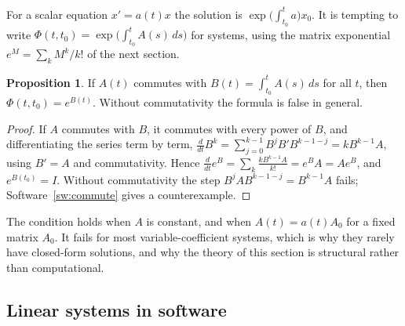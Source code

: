 \documentclass[11pt,a4paper]{article}
\numberwithin{equation}{section}
\theoremstyle{definition}
\newtheorem{prop}[thm]{Proposition}
\begin{document}
For a scalar equation $x' = a(t)x$ the solution is $\exp\bigl(\int_{t_0}^ta\bigr)x_0$. It is tempting to write $\Phi(t, t_0) = \exp\bigl(\int_{t_0}^tA(s)\,ds\bigr)$ for systems, using the matrix exponential
$e^M = \sum_kM^k/k!$ of the next section.

\begin{prop}
\label{prop:commute}
If $A(t)$ commutes with $B(t) = \int_{t_0}^tA(s)\,ds$ for all $t$, then $\Phi(t, t_0) = e^{B(t)}$. Without commutativity the formula is false in general.
\end{prop}

\begin{proof}
If $A$ commutes with $B$, it commutes with every power of $B$, and differentiating the series term by term, $\frac{d}{dt}B^k = \sum_{j=0}^{k-1}B^jB'B^{k-1-j} = kB^{k-1}A$, using $B' = A$ and commutativity.
Hence $\frac{d}{dt}e^B = \sum_k\frac{kB^{k-1}A}{k!} = e^BA = Ae^B$, and $e^{B(t_0)} = I$. Without commutativity the step $B^jAB^{k-1-j} = B^{k-1}A$ fails; Software~\ref{sw:commute} gives a counterexample.
\end{proof}

The condition holds when $A$ is constant, and when $A(t) = a(t)A_0$ for a fixed matrix $A_0$. It fails for most variable-coefficient systems, which is why they rarely have closed-form
solutions, and why the theory of this section is structural rather than computational.

\subsection{Linear systems in software}
\label{ssec:software4}
\end{document}
